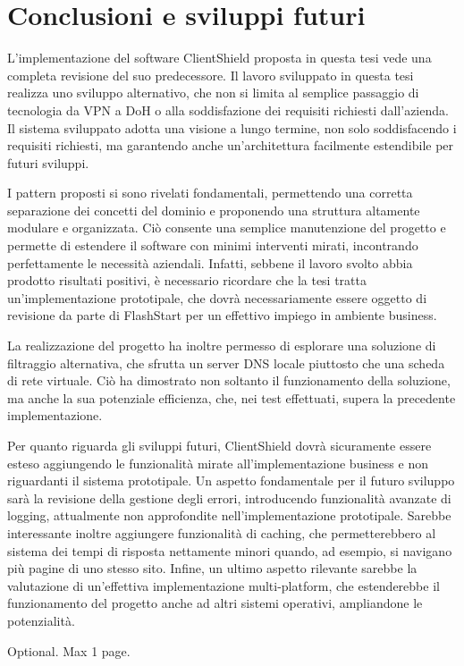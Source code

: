 \documentclass[12pt,a4paper,openright,twoside]{book}
\begin{document}
\chapter{Conclusioni e sviluppi futuri}

L'implementazione del software ClientShield proposta in questa tesi vede una completa revisione del suo predecessore.
Il lavoro sviluppato in questa tesi realizza uno sviluppo alternativo, che non si limita al semplice passaggio di tecnologia da \gls{VPN} a \gls{DoH} o alla soddisfazione dei requisiti richiesti dall'azienda.
Il sistema sviluppato adotta una visione a lungo termine, non solo soddisfacendo i requisiti richiesti, ma garantendo anche un'architettura facilmente estendibile per futuri sviluppi.

I pattern proposti si sono rivelati fondamentali, permettendo una corretta separazione dei concetti del dominio e proponendo una struttura altamente modulare e organizzata.
Ciò consente una semplice manutenzione del progetto e permette di estendere il software con minimi interventi mirati, incontrando perfettamente le necessità aziendali.
Infatti, sebbene il lavoro svolto abbia prodotto risultati positivi, è necessario ricordare che la tesi tratta un'implementazione prototipale, che dovrà necessariamente essere oggetto di revisione da parte di FlashStart per un effettivo impiego in ambiente business.

La realizzazione del progetto ha inoltre permesso di esplorare una soluzione di filtraggio alternativa, che sfrutta un server \gls{DNS} locale piuttosto che una scheda di rete virtuale.
Ciò ha dimostrato non soltanto il funzionamento della soluzione, ma anche la sua potenziale efficienza, che, nei test effettuati, supera la precedente implementazione.

Per quanto riguarda gli sviluppi futuri, ClientShield dovrà sicuramente essere esteso aggiungendo le funzionalità mirate all'implementazione business e non riguardanti il sistema prototipale.
Un aspetto fondamentale per il futuro sviluppo sarà la revisione della gestione degli errori, introducendo funzionalità avanzate di logging, attualmente non approfondite nell'implementazione prototipale.  
Sarebbe interessante inoltre aggiungere funzionalità di caching, che permetterebbero al sistema dei tempi di risposta nettamente minori quando, ad esempio, si navigano più pagine di uno stesso sito.
Infine, un ultimo aspetto rilevante sarebbe la valutazione di un'effettiva implementazione multi-platform, che estenderebbe il funzionamento del progetto anche ad altri sistemi operativi, ampliandone le potenzialità.  



\backmatter




\begin{acknowledgements} %
Optional. Max 1 page.
\end{acknowledgements}
\end{document}
